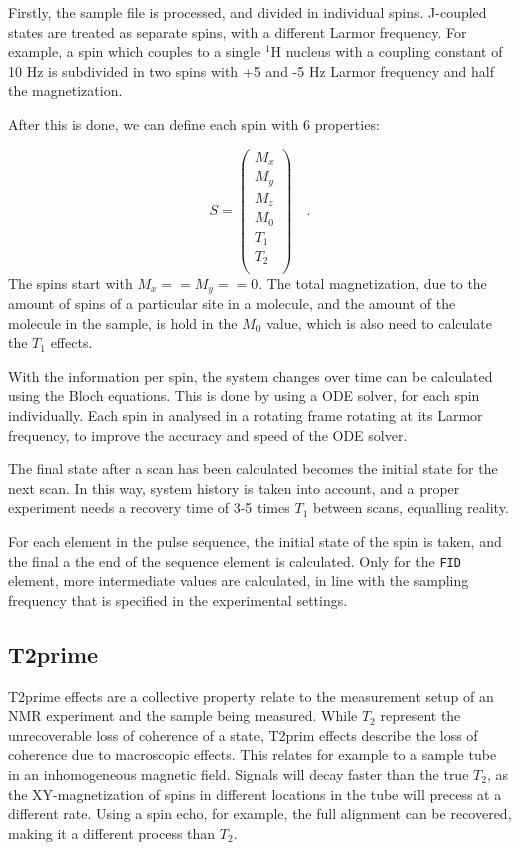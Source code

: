 \documentclass[11pt,a4paper]{article}
\begin{document}
Firstly, the sample file is processed, and divided in individual spins. J-coupled states are treated as separate spins, with a different Larmor frequency. For example, a spin which couples to a single $^1$H nucleus with a coupling constant of 10 Hz is subdivided in two spins with +5 and -5 Hz Larmor frequency and half the magnetization.

After this is done, we can define each spin with 6 properties:

\begin{equation}
  S = \left( \begin{array}{c}
M_x \\
M_y \\
M_z \\
M_0 \\
T_1 \\
T_2\\
  \end{array} \right) \quad .
\end{equation}
The spins start with $M_x == M_y == 0$. The total magnetization, due to the amount of spins of a particular site in a molecule, and the amount of the molecule in the sample, is hold in the $M_0$ value, which is also need to calculate the $T_1$ effects.

With the information per spin, the system changes over time can be calculated using the Bloch equations. This is done by using a ODE solver, for each spin individually. Each spin in analysed in a rotating frame rotating at its Larmor frequency, to improve the accuracy and speed of the ODE solver.

The final state after a scan has been calculated becomes the initial state for the next scan. In this way, system history is taken into account, and a proper experiment needs a recovery time of 3-5 times $T_1$ between scans, equalling reality.

For each element in the pulse sequence, the initial state of the spin is taken, and the final a the end of the sequence element is calculated. Only for the \texttt{FID} element, more intermediate values are calculated, in line with the sampling frequency that is specified in the experimental settings.


\subsection{T2prime}
T2prime effects are a collective property relate to the measurement setup of an NMR experiment and the sample being measured. While $T_2$ represent the unrecoverable loss of coherence of a state, T2prim effects describe the loss of coherence due to macroscopic effects. This relates for example to a sample tube in an inhomogeneous magnetic field. Signals will decay faster than the true $T_2$, as the XY-magnetization of spins in different locations in the tube will precess at a different rate. Using a spin echo, for example, the full alignment can be recovered, making it a different process than $T_2$.
\end{document}

